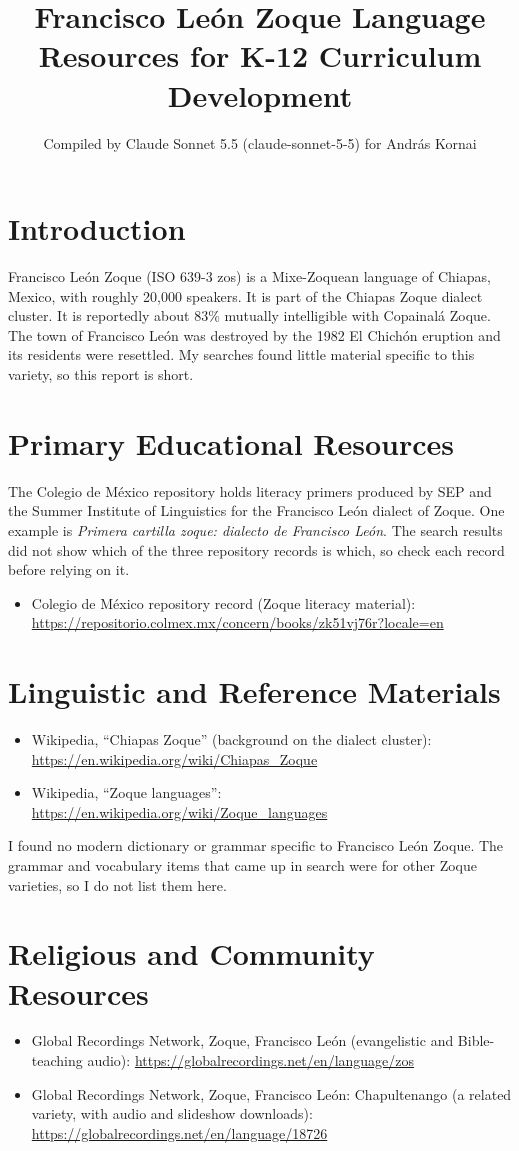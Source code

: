 \documentclass[12pt]{article}
\title{Francisco Le\'on Zoque Language Resources for K-12 Curriculum Development}
\author{Compiled by Claude Sonnet 5.5 (claude-sonnet-5-5) for Andr\'as Kornai}
\date{}
\begin{document}
\maketitle

\section{Introduction}
Francisco Le\'on Zoque (ISO 639-3 zos) is a Mixe-Zoquean language of Chiapas, Mexico, with roughly 20,000 speakers. It is part of the Chiapas Zoque dialect cluster. It is reportedly about 83\% mutually intelligible with Copainal\'a Zoque. The town of Francisco Le\'on was destroyed by the 1982 El Chich\'on eruption and its residents were resettled. My searches found little material specific to this variety, so this report is short.

\section{Primary Educational Resources}
The Colegio de M\'exico repository holds literacy primers produced by SEP and the Summer Institute of Linguistics for the Francisco Le\'on dialect of Zoque. One example is \emph{Primera cartilla zoque: dialecto de Francisco Le\'on}. The search results did not show which of the three repository records is which, so check each record before relying on it.
\begin{itemize}
\item Colegio de M\'exico repository record (Zoque literacy material): \url{https://repositorio.colmex.mx/concern/books/zk51vj76r?locale=en}
\end{itemize}

\section{Linguistic and Reference Materials}
\begin{itemize}
\item Wikipedia, ``Chiapas Zoque'' (background on the dialect cluster): \url{https://en.wikipedia.org/wiki/Chiapas_Zoque}
\item Wikipedia, ``Zoque languages'': \url{https://en.wikipedia.org/wiki/Zoque_languages}
\end{itemize}
I found no modern dictionary or grammar specific to Francisco Le\'on Zoque. The grammar and vocabulary items that came up in search were for other Zoque varieties, so I do not list them here.

\section{Religious and Community Resources}
\begin{itemize}
\item Global Recordings Network, Zoque, Francisco Le\'on (evangelistic and Bible-teaching audio): \url{https://globalrecordings.net/en/language/zos}
\item Global Recordings Network, Zoque, Francisco Le\'on: Chapultenango (a related variety, with audio and slideshow downloads): \url{https://globalrecordings.net/en/language/18726}
\end{itemize}
\end{document}
